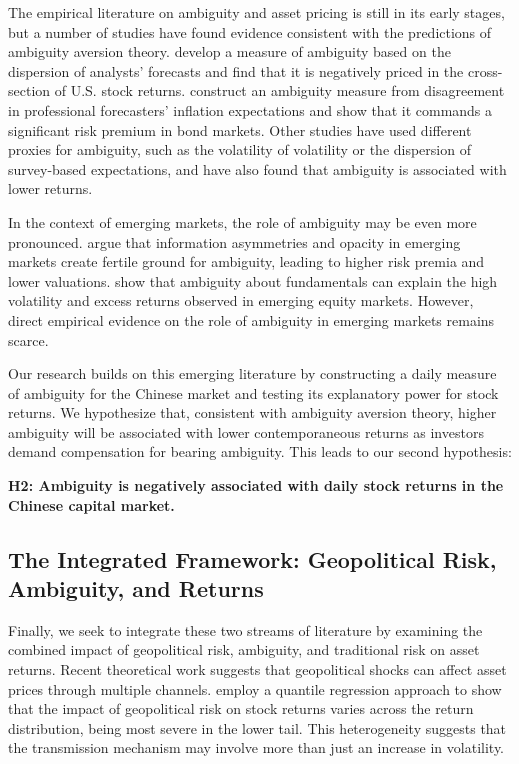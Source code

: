\documentclass[preprint,12pt,authoryear]{elsarticle}
\begin{document}
The empirical literature on ambiguity and asset pricing is still in its early stages, but a number of studies have found evidence consistent with the predictions of ambiguity aversion theory. \citet{brenner2018asset} develop a measure of ambiguity based on the dispersion of analysts' forecasts and find that it is negatively priced in the cross-section of U.S. stock returns. \citet{ulrich2013inflation} construct an ambiguity measure from disagreement in professional forecasters' inflation expectations and show that it commands a significant risk premium in bond markets. Other studies have used different proxies for ambiguity, such as the volatility of volatility or the dispersion of survey-based expectations, and have also found that ambiguity is associated with lower returns.

In the context of emerging markets, the role of ambiguity may be even more pronounced. \citet{easley2009ambiguity} argue that information asymmetries and opacity in emerging markets create fertile ground for ambiguity, leading to higher risk premia and lower valuations. \citet{ozsoylev2011ambiguity} show that ambiguity about fundamentals can explain the high volatility and excess returns observed in emerging equity markets. However, direct empirical evidence on the role of ambiguity in emerging markets remains scarce.

Our research builds on this emerging literature by constructing a daily measure of ambiguity for the Chinese market and testing its explanatory power for stock returns. We hypothesize that, consistent with ambiguity aversion theory, higher ambiguity will be associated with lower contemporaneous returns as investors demand compensation for bearing ambiguity. This leads to our second hypothesis:

\textbf{H2: Ambiguity is negatively associated with daily stock returns in the Chinese capital market.}

\subsection{The Integrated Framework: Geopolitical Risk, Ambiguity, and Returns}

Finally, we seek to integrate these two streams of literature by examining the combined impact of geopolitical risk, ambiguity, and traditional risk on asset returns. Recent theoretical work suggests that geopolitical shocks can affect asset prices through multiple channels. \citet{balcilar2018geopolitical} employ a quantile regression approach to show that the impact of geopolitical risk on stock returns varies across the return distribution, being most severe in the lower tail. This heterogeneity suggests that the transmission mechanism may involve more than just an increase in volatility.
\end{document}
